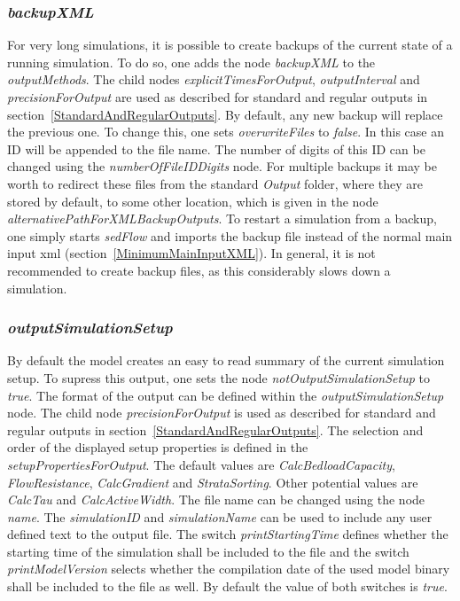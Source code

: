 \documentclass[11pt,a4paper]{article}
\begin{document}
\subsubsection{\emph{backupXML}}\label{backupXML}
For very long simulations, it is possible to create backups of the current state of a running simulation. To do so, one adds the node \emph{backupXML} to the \emph{outputMethods}. The child nodes \emph{explicitTimesForOutput}, \emph{outputInterval} and \emph{precisionForOutput} are used as described for standard and regular outputs in section~\ref{StandardAndRegularOutputs}. By default, any new backup will replace the previous one. To change this, one sets \emph{overwriteFiles} to \emph{false}. In this case an ID will be appended to the file name. The number of digits of this ID can be changed using the \emph{numberOfFileIDDigits} node. For multiple backups it may be worth to redirect these files from the standard \emph{Output} folder, where they are stored by default, to some other location, which is given in the node \emph{alternativePathForXMLBackupOutputs}. To restart a simulation from a backup, one simply starts \emph{sedFlow} and imports the backup file instead of the normal main input xml (section~\ref{MinimumMainInputXML}). In general, it is not recommended to create backup files, as this considerably slows down a simulation.

\subsubsection{\emph{outputSimulationSetup}}\label{outputSimulationSetup}
By default the model creates an easy to read summary of the current simulation setup. To supress this output, one sets the node \emph{notOutputSimulationSetup} to \emph{true}. The format of the output can be defined within the \emph{outputSimulationSetup} node. The child node \emph{precisionForOutput} is used as described for standard and regular outputs in section~\ref{StandardAndRegularOutputs}. The selection and order of the displayed setup properties is defined in the \emph{setupPropertiesForOutput}. The default values are \emph{CalcBedloadCapacity}, \emph{FlowResistance}, \emph{CalcGradient} and \emph{StrataSorting}. Other potential values are \emph{CalcTau} and \emph{CalcActiveWidth}. The file name can be changed using the node \emph{name}. The \emph{simulationID} and \emph{simulationName} can be used to include any user defined text to the output file. The switch \emph{printStartingTime} defines whether the starting time of the simulation shall be included to the file and the switch \emph{printModelVersion} selects whether the compilation date of the used model binary shall be included to the file as well. By default the value of both switches is \emph{true}.
\end{document}
